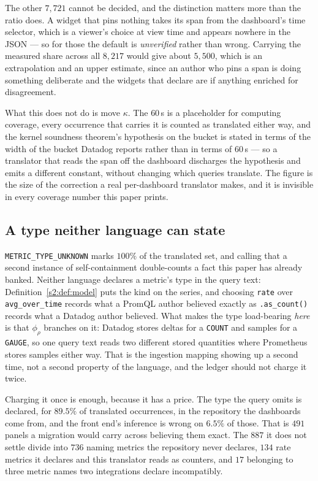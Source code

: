 The other $7{,}721$ cannot be decided, and the distinction matters more than the ratio
does. A widget that pins nothing takes its span from the dashboard's time selector, which
is a viewer's choice at view time and appears nowhere in the JSON --- so for those the
default is \emph{unverified} rather than wrong. Carrying the measured share across all
$8{,}217$ would give about $5{,}500$, which is an extrapolation and an upper estimate, since
an author who pins a span is doing something deliberate and the widgets that declare are if
anything enriched for disagreement.

What this does not do is move $\kappa$. The $60$\,s is a placeholder for computing
coverage, every occurrence that carries it is counted as translated either way, and the
kernel soundness theorem's hypothesis on the bucket is stated in terms of the width of the
bucket Datadog reports rather than in terms of $60$\,s --- so a translator that reads the
span off the dashboard discharges the hypothesis and emits a different constant, without
changing which queries translate. The figure is the size of the correction a real
per-dashboard translator makes, and it is invisible in every coverage number this paper
prints.

\subsection{A type neither language can state}
\label{s2:sec:type}

\texttt{METRIC\_TYPE\_UNKNOWN} marks $100\%$ of the translated set, and calling that a
second instance of self-containment double-counts a fact this paper has already banked.
Neither language declares a metric's type in the query text: Definition~\ref{s2:def:model}
puts the kind on the series, and choosing \texttt{rate} over \texttt{avg\_over\_time}
records what a PromQL author believed exactly as \texttt{.as\_count()} records what a
Datadog author believed. What makes the type load-bearing \emph{here} is that $\phi_\rho$
branches on it: Datadog stores deltas for a \texttt{COUNT} and samples for a
\texttt{GAUGE}, so one query text reads two different stored quantities where Prometheus
stores samples either way. That is the ingestion mapping showing up a second time, not a
second property of the language, and the ledger should not charge it twice.

Charging it once is enough, because it has a price. The type the query omits is declared,
for $89.5\%$ of translated occurrences, in the repository the dashboards come from, and the
front end's inference is wrong on $6.5\%$ of those. That is $491$ panels a migration would
carry across believing them exact. The $887$ it does not settle divide into $736$ naming
metrics the repository never declares, $134$ rate metrics it declares and this translator
reads as counters, and $17$ belonging to three metric names two integrations declare
incompatibly.

